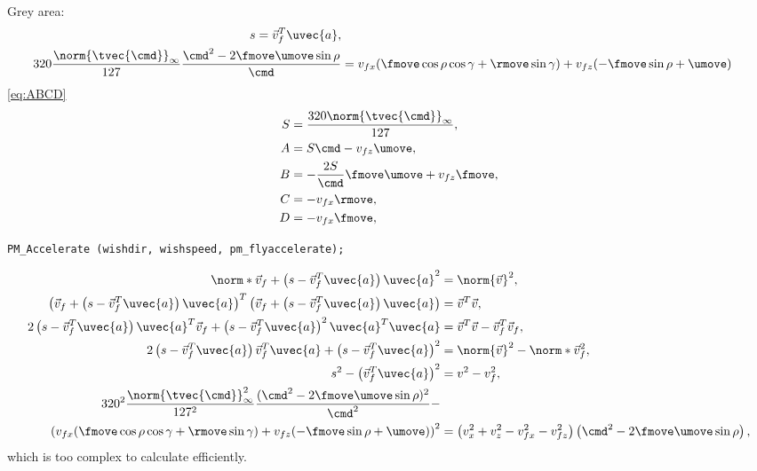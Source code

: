 Grey area:
\begin{align*}
s = \vec{v}_f^T \uvec{a},\\
320\frac{\norm{\tvec{\cmd}}_{\infty}}{127\hphantom{_{\infty}}} \frac{\cmd^2  - 2\fmove\umove\sin\rho}{\cmd} &= v_{fx}(\fmove \cos\rho\cos\gamma + \rmove \sin\gamma) + v_{fz}(-\fmove \sin\rho + \umove)
\end{align*}
\eqref{eq:ABCD}
\begin{align*}
S &= \frac{320\norm{\tvec{\cmd}}_{\infty}}{127},\\
A &= S\cmd         - v_{fz}\umove,\\
B &= -\frac{2S}{\cmd}\fmove\umove + v_{fz}\fmove,\\
C &= -v_{fx}\rmove,\\
D &= -v_{fx}\fmove,
\end{align*}

\texttt{PM\_Accelerate (wishdir, wishspeed, pm\_flyaccelerate);}

\begin{align*}
\norm*{\vec{v}_f + \left(s - \vec{v}_f^T \uvec{a} \right)\uvec{a}}^2 &= \norm{\vec{v}}^2,\\
\left(\vec{v}_f + \left(s - \vec{v}_f^T \uvec{a} \right)\uvec{a} \right)^T \left(\vec{v}_f + \left(s - \vec{v}_f^T \uvec{a} \right)\uvec{a} \right) &= \vec{v}^T \vec{v},\\
2\left(s - \vec{v}_f^T \uvec{a} \right)\uvec{a}^T \vec{v}_f + \left(s - \vec{v}_f^T \uvec{a} \right)^2\uvec{a}^T\uvec{a} &= \vec{v}^T \vec{v} - \vec{v}_f^T \vec{v}_f,\\
2\left(s - \vec{v}_f^T \uvec{a} \right)\vec{v}_f^T \uvec{a} + \left(s - \vec{v}_f^T \uvec{a} \right)^2 &= \norm{\vec{v}}^2 - \norm*{\vec{v}_f}^2,\\
s^2 - \left(\vec{v}_f^T \uvec{a}\right)^2 &= v^2 - v_f^2,\\
320^2\frac{\norm{\tvec{\cmd}}_{\infty}^2}{127^2\hphantom{_{\infty}}} \frac{(\cmd^2  - 2\fmove\umove\sin\rho)^2}{\cmd^2} -\\ \left(v_{fx}(\fmove \cos\rho\cos\gamma + \rmove \sin\gamma) + v_{fz}(-\fmove \sin\rho + \umove) \right)^2 &= \left(v_x^2 + v_z^2 - v_{fx}^2 - v_{fz}^2 \right) \left(\cmd^2  - 2\fmove\umove\sin\rho \right),
\end{align*}
which is too complex to calculate efficiently.
